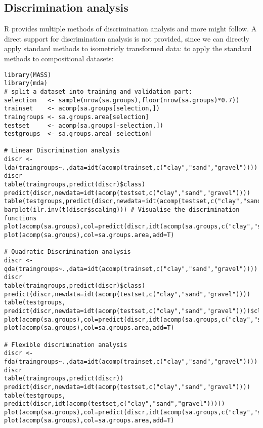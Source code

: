 \documentclass{article}
\begin{document}
\subsection{Discrimination analysis} 
R provides multiple methods of discrimination analysis and more might follow.
A direct support for discrimination analysis is not provided, since we can
directly apply standard methods to isometricly transformed data:
to apply the standard methods to compositional datasets:
\begin{verbatim}
library(MASS) 
library(mda)
# split a dataset into training and validation part:
selection   <- sample(nrow(sa.groups),floor(nrow(sa.groups)*0.7))
trainset    <- acomp(sa.groups[selection,])
traingroups <- sa.groups.area[selection]
testset     <- acomp(sa.groups[-selection,])
testgroups  <- sa.groups.area[-selection]

# Linear Discrimination analysis
discr <- lda(traingroups~.,data=idt(acomp(trainset,c("clay","sand","gravel"))))
discr
table(traingroups,predict(discr)$class)
predict(discr,newdata=idt(acomp(testset,c("clay","sand","gravel"))))
table(testgroups,predict(discr,newdata=idt(acomp(testset,c("clay","sand","gravel"))))$class)
barplot(ilr.inv(t(discr$scaling))) # Visualise the discrimination functions
plot(acomp(sa.groups),col=predict(discr,idt(acomp(sa.groups,c("clay","sand","gravel"))))$class,pch=20)
plot(acomp(sa.groups),col=sa.groups.area,add=T)

# Quadratic Discrimination analysis
discr <- qda(traingroups~.,data=idt(acomp(trainset,c("clay","sand","gravel"))))
discr
table(traingroups,predict(discr)$class)
predict(discr,newdata=idt(acomp(testset,c("clay","sand","gravel"))))
table(testgroups, predict(discr,newdata=idt(acomp(testset,c("clay","sand","gravel"))))$class)
plot(acomp(sa.groups),col=predict(discr,idt(acomp(sa.groups,c("clay","sand","gravel"))))$class,pch=20)
plot(acomp(sa.groups),col=sa.groups.area,add=T)

# Flexible discrimination analysis
discr <- fda(traingroups~.,data=idt(acomp(trainset,c("clay","sand","gravel"))))
discr
table(traingroups,predict(discr))
predict(discr,newdata=idt(acomp(testset,c("clay","sand","gravel"))))
table(testgroups, predict(discr,idt(acomp(testset,c("clay","sand","gravel")))))
plot(acomp(sa.groups),col=predict(discr,idt(acomp(sa.groups,c("clay","sand","gravel")))),pch=20)
plot(acomp(sa.groups),col=sa.groups.area,add=T)
\end{verbatim}
\end{document}
